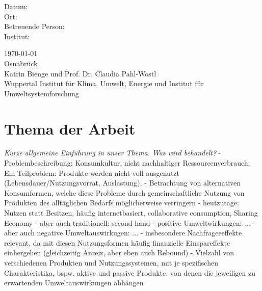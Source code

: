 \documentclass[11pt, titlepage=true]{scrartcl} %
\newcommand{\was}[1]{\small\textit{#1}}
\newcommand{\betreuung}{Katrin Bienge und Prof. Dr. Claudia Pahl-Wostl}
\newcommand{\institut}{Wuppertal Institut für Klima, Umwelt, Energie und Institut für Umweltsystemforschung}
\newcommand{\ort}{Osnabrück}
\begin{document}
\begin{titlepage}
\begin{center}
      \vfill
{}
      \begin{minipage}[t]{0.45\textwidth}
        \begin{flushright}
          Datum:              \\[1.2ex]
          Ort:                \\[1.2ex]
          Betreuende Person:  \\[1.2ex]
          Institut:           \\[3ex]
        \end{flushright}
      \end{minipage}
      \hspace{0.01\textwidth}
      \begin{minipage}[t]{0.45\textwidth}
        \begin{flushleft}
          \today\\[1.2ex]
          \ort\\[1.2ex]
          \betreuung\\[1.2ex]
          \institut \\[3ex]
        \end{flushleft}
      \end{minipage}
  \end{center}
\end{titlepage}
\tableofcontents
\section{Thema der Arbeit}
\was{Kurze allgemeine Einführung in unser Thema. Was wird behandelt?}
- Problembeschreibung: Konsumkultur, nicht nachhaltiger Ressourcenverbrauch. Ein Teilproblem: Produkte werden nicht voll ausgenutzt (Lebensdauer/Nutzungsvorrat, Auslastung).
- Betrachtung von alternativen Konsumformen, welche diese Probleme durch gemeinschaftliche Nutzung von Produkten des alltäglichen Bedarfs möglicherweise verringern
- heutzutage: Nutzen statt Besitzen, häufig internetbasiert, collaborative consumption, Sharing Economy
- aber auch traditionell: second hand
- positive Umweltwirkungen: ...
- aber auch negative Umweltauswirkugen: ...
- insbesondere Nachfrageeeffekte relevant, da mit diesen Nutzungsformen häufig finanzielle Einspareffekte einhergehen (gleichzeitig Anreiz, aber eben auch Rebound)
- Vielzahl von verschiedenen Produkten und Nutzungssystemen, mit je spezifischen Charakteristika, bspw. aktive und passive Produkte, von denen die jeweiligen zu erwartenden Umweltauswirkungen abhängen
\end{document}
